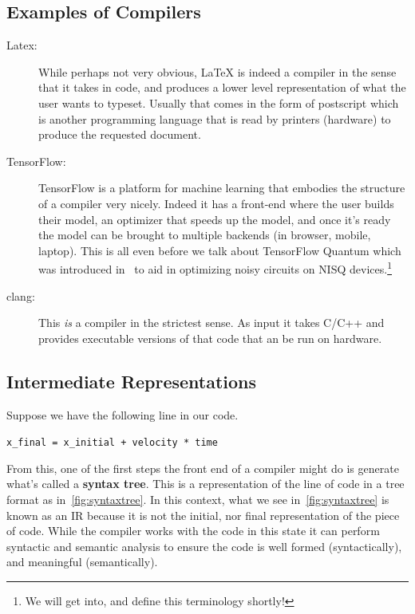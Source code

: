 \subsection{Examples of Compilers}
\begin{description}
    \item[Latex:] While perhaps not very obvious, \LaTeX{} is indeed a compiler in the sense that it takes in code, and produces a lower level representation of what the user wants to typeset. Usually that comes in the form of postscript which is another programming language that is read by printers (hardware) to produce the requested document.
    \item[TensorFlow:] TensorFlow is a platform for machine learning that embodies the structure of a compiler very nicely. Indeed it has a front-end where the user builds their model, an optimizer that speeds up the model, and once it's ready the model can be brought to multiple backends (in browser, mobile, laptop). This is all even before we talk about TensorFlow Quantum which was introduced in~\cite{tensoflowquantum} to aid in optimizing noisy circuits on \acs{NISQ} devices.\footnote{We will get into, and define this terminology shortly!}
    \item[clang:] This \emph{is} a compiler in the strictest sense. As input it takes C/C++ and provides executable versions of that code that an be run on hardware.
\end{description}

\subsection{Intermediate Representations}

Suppose we have the following line in our code.
\begin{center}
    \verb|x_final = x_initial + velocity * time|
\end{center}
From this, one of the first steps the front end of a compiler might do is generate what's called a \textbf{syntax tree}.
This is a representation of the line of code in a tree format as in~\cref{fig:syntaxtree}.
In this context, what we see in~\cref{fig:syntaxtree} is known as an \ac{IR} because it is not the initial, nor final representation of the piece of code.
While the compiler works with the code in this state it can perform syntactic and semantic analysis to ensure the code is well formed (syntactically), and meaningful (semantically).

